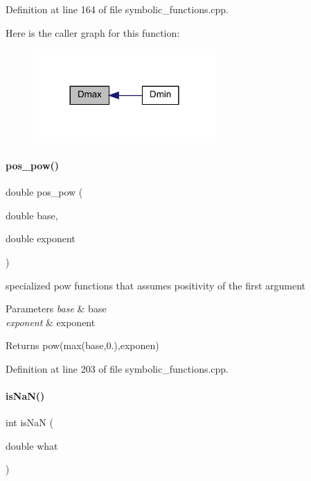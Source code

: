 Definition at line 164 of file symbolic\+\_\+functions.\+cpp.

Here is the caller graph for this function\+:
\nopagebreak
\begin{figure}[H]
\begin{center}
\leavevmode
\includegraphics[width=197pt]{namespaceamici_a9afb37cc1fa38a1bfa427f9c27255e5b_icgraph}
\end{center}
\end{figure}
\mbox{\label{namespaceamici_af596fe82a4ff6588a527a73d659c4db6}} 
\paragraph{\texorpdfstring{pos\+\_\+pow()}{pos\_pow()}}
{\footnotesize\ttfamily double pos\+\_\+pow (\begin{DoxyParamCaption}\item[{double}]{base,  }\item[{double}]{exponent }\end{DoxyParamCaption})}

specialized pow functions that assumes positivity of the first argument


\begin{DoxyParams}{Parameters}
{\em base} & base \\
\hline
{\em exponent} & exponent \\
\hline
\end{DoxyParams}
\begin{DoxyReturn}{Returns}
pow(max(base,0.),exponen) 
\end{DoxyReturn}


Definition at line 203 of file symbolic\+\_\+functions.\+cpp.

\mbox{\label{namespaceamici_a7452657cd5f8d541f9e823df5e82c516}} 
\paragraph{\texorpdfstring{is\+Na\+N()}{isNaN()}}
{\footnotesize\ttfamily int is\+NaN (\begin{DoxyParamCaption}\item[{double}]{what }\end{DoxyParamCaption})}

